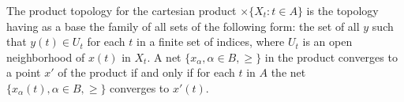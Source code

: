 The product topology for the cartesian product $\times\{X_t : t \in A\}$ is the topology having as a base the family of all sets of the following form: the set of all $y$ such that $y(t) \in U_t$ for each $t$ in a finite set of indices, where $U_t$ is an open neighborhood of $x(t)$ in $X_t$. A net $\{x_\alpha, \alpha \in B, \geq\}$ in the product converges to a point $x'$ of the product if and only if for each $t$ in $A$ the net $\{x_\alpha(t), \alpha \in B, \geq\}$ converges to $x'(t)$.
